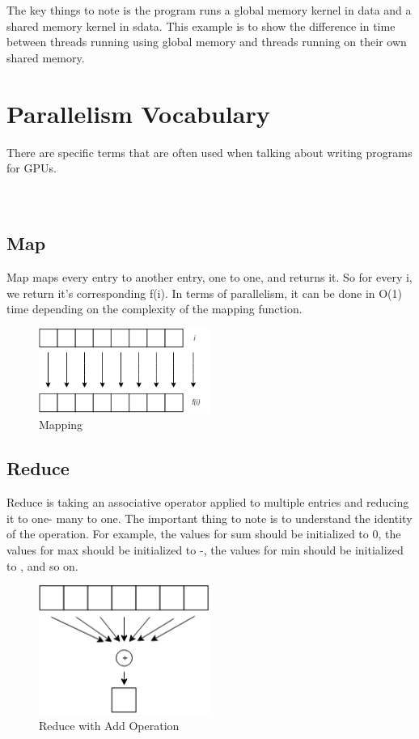 \documentclass[twoside]{article}
\begin{document}
The key things to note is the program runs a global memory kernel in data and a shared memory kernel in sdata. This example is to show the difference in time between threads running using global memory and threads running on their own shared memory. 


\section{Parallelism Vocabulary}
There are specific terms that are often used when talking about writing programs for GPUs.
\\
\\
\\
\subsection{Map}
Map maps every entry to another entry, one to one, and returns it. So for every i, we return it's corresponding f(i). In terms of parallelism, it can be done in O(1) time depending on the complexity of the mapping function.  

\begin{figure}[ht]
  \centering
  \includegraphics[width=0.50\textwidth]{./Mapping.png} 
  \caption{Mapping}
  \label{fig:map}
\end{figure}

\subsection{Reduce}
Reduce is taking an associative operator applied to multiple entries and reducing it to one- many to one. The important thing to note is to understand the identity of the operation. For example, the values for sum should be initialized to 0, the values for max should be initialized to -\infinity, the values for min should be initialized to \infinity, and so on. 

\begin{figure}[ht]
  \centering
  \includegraphics[width=0.50\textwidth]{./Reduce.png} 
  \caption{Reduce with Add Operation}
  \label{fig:reduce}
\end{figure}
\\
\\
\\
\\
\\
\\
\end{document}
